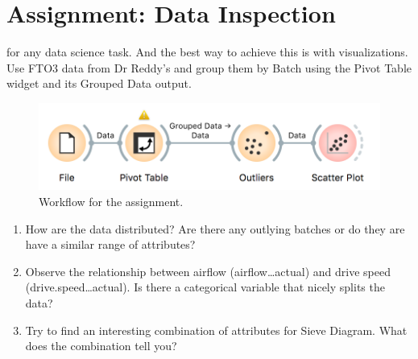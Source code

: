 \chapter{Assignment: Data Inspection}
\label{hw:data-inspection}

 for any data science task. And the best way to achieve this is with visualizations. Use FTO3 data from Dr Reddy's and group them by Batch using the Pivot Table widget and its Grouped Data output.

\begin{figure}[h]
  \centering
  \includegraphics[width=\linewidth]{data-inspection.png}%
  \caption{Workflow for the assignment.}
  \label{fig:data-inspection-workflow}
\end{figure}

\begin{enumerate}
    \item How are the data distributed? Are there any outlying batches or do they are have a similar range of attributes?
    \item Observe the relationship between airflow (airflow…actual) and drive speed (drive.speed…actual). Is there a categorical variable that nicely splits the data?
    \item Try to find an interesting combination of attributes for Sieve Diagram. What does the combination tell you?
\end{enumerate}